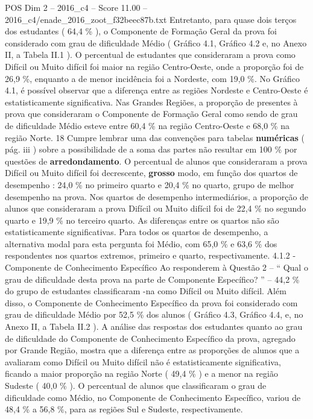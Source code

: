 \begin{textsample}{POS Dim 2 – 2016\_c4 – Score 11.00 – 2016\_c4/enade\_2016\_zoot\_f32beec87b.txt}
Entretanto, para quase dois terços dos estudantes ( 64,4 \% ), o Componente de Formação Geral da prova foi considerado com grau de dificuldade Médio ( Gráfico 4.1, Gráfico 4.2 e, no Anexo II, a Tabela II.1 ).
O percentual de estudantes que consideraram a prova como Difícil ou Muito difícil foi maior na região Centro-Oeste, onde a proporção foi de 26,9 \%, enquanto a de menor incidência foi a Nordeste, com 19,0 \%.
No Gráfico 4.1, é possível observar que a diferença entre as regiões Nordeste e Centro-Oeste é estatisticamente significativa.
Nas Grandes Regiões, a proporção de presentes à prova que consideraram o Componente de Formação Geral como sendo de grau de dificuldade Médio esteve entre 60,4 \% na região Centro-Oeste e 68,0 \% na região Norte. 18 Cumpre lembrar uma das convenções para tabelas \textbf{numéricas} ( pág. iii ) sobre a possibilidade de a soma das partes não resultar em 100 \% por questões de \textbf{arredondamento}.
O percentual de alunos que consideraram a prova Difícil ou Muito difícil foi decrescente, \textbf{grosso} modo, em função dos quartos de desempenho : 24,0 \% no primeiro quarto e 20,4 \% no quarto, grupo de melhor desempenho na prova.
Nos quartos de desempenho intermediários, a proporção de alunos que consideraram a prova Difícil ou Muito difícil foi de 22,4 \% no segundo quarto e 19,9 \% no terceiro quarto.
As diferenças entre os quartos não são estatisticamente significativas.
Para todos os quartos de desempenho, a alternativa modal para esta pergunta foi Médio, com 65,0 \% e 63,6 \% dos respondentes nos quartos extremos, primeiro e quarto, respectivamente. 4.1.2 - Componente de Conhecimento Específico Ao responderem à Questão 2 – “ Qual o grau de dificuldade desta prova na parte de Componente Específico? ” – 44,2 \% do grupo de estudantes classificaram -na como Difícil ou Muito difícil.
Além disso, o Componente de Conhecimento Específico da prova foi considerado com grau de dificuldade Médio por 52,5 \% dos alunos ( Gráfico 4.3, Gráfico 4.4, e, no Anexo II, a Tabela II.2 ).
A análise das respostas dos estudantes quanto ao grau de dificuldade do Componente de Conhecimento Específico da prova, agregado por Grande Região, mostra que a diferença entre as proporções de alunos que a avaliaram como Difícil ou Muito difícil não é estatisticamente significativa, ficando a maior proporção na região Norte ( 49,4 \% ) e a menor na região Sudeste ( 40,0 \% ).
O percentual de alunos que classificaram o grau de dificuldade como Médio, no Componente de Conhecimento Específico, variou de 48,4 \% a 56,8 \%, para as regiões Sul e Sudeste, respectivamente.

\end{textsample}
